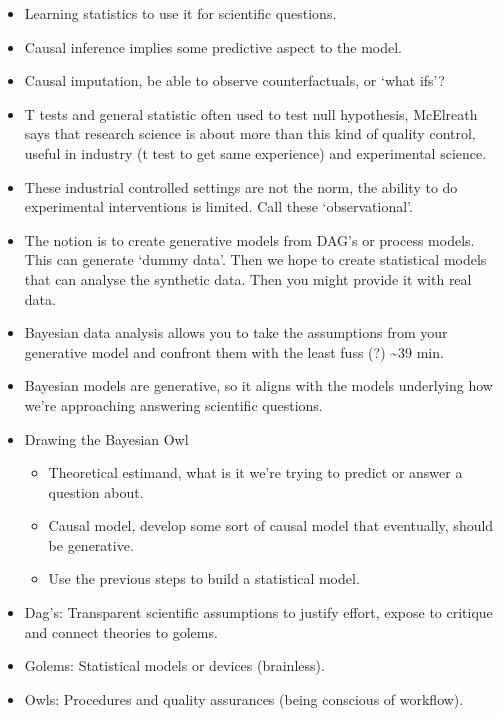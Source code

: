 \documentclass[11pt]{article}
\begin{document}
\begin{itemize}
\tightlist
\item
  Learning statistics to use it for scientific questions.
\item
  Causal inference implies some predictive aspect to the model.
\item
  Causal imputation, be able to observe counterfactuals, or `what ifs'?
\item
  T tests and general statistic often used to test null hypothesis,
  McElreath says that research science is about more than this kind of
  quality control, useful in industry (t test to get same experience)
  and experimental science.
\item
  These industrial controlled settings are not the norm, the ability to
  do experimental interventions is limited. Call these `observational'.
\item
  The notion is to create generative models from DAG's or process
  models. This can generate `dummy data'. Then we hope to create
  statistical models that can analyse the synthetic data. Then you might
  provide it with real data.
\item
  Bayesian data analysis allows you to take the assumptions from your
  generative model and confront them with the least fuss (?)
  \textasciitilde{}39 min.
\item
  Bayesian models are generative, so it aligns with the models
  underlying how we're approaching answering scientific questions.
\item
  Drawing the Bayesian Owl

  \begin{itemize}
  \tightlist
  \item
    Theoretical estimand, what is it we're trying to predict or answer a
    question about.
  \item
    Causal model, develop some sort of causal model that eventually,
    should be generative.
  \item
    Use the previous steps to build a statistical model.
  \end{itemize}
\item
  Dag's: Transparent scientific assumptions to justify effort, expose to
  critique and connect theories to golems.
\item
  Golems: Statistical models or devices (brainless).
\item
  Owls: Procedures and quality assurances (being conscious of workflow).
\end{itemize}
\end{document}
